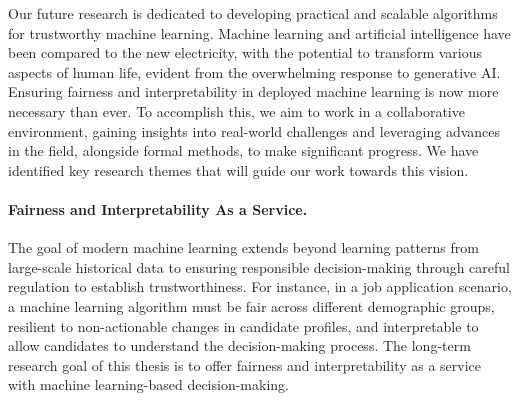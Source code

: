 Our future research is dedicated to developing practical and scalable algorithms for trustworthy machine learning. Machine learning and artificial intelligence have been compared to the new electricity, with the potential to transform various aspects of human life, evident from the overwhelming response to generative AI. Ensuring fairness and interpretability in deployed machine learning is now more necessary than ever. To accomplish this, we aim to work in a collaborative environment, gaining insights into real-world challenges and leveraging advances in the field, alongside formal methods, to make significant progress. We have identified key research themes that will guide our work towards this vision.


\paragraph{Fairness and Interpretability As a Service.} 
The goal of modern machine learning extends beyond learning patterns from large-scale historical data to ensuring responsible decision-making through careful regulation to establish trustworthiness. For instance, in a job application scenario, a machine learning algorithm must be fair across different demographic groups, resilient to non-actionable changes in candidate profiles, and interpretable to allow candidates to understand the decision-making process. The long-term research goal of this thesis is to offer fairness and interpretability as a service with machine learning-based decision-making. 

